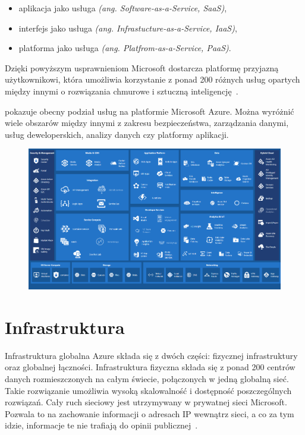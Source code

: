 \begin{itemize}
    \item aplikacja jako usługa \textit{(ang. Software-as-a-Service, SaaS)},
    \item interfejs jako usługa \textit{(ang. Infrastucture-as-a-Service, IaaS)},
    \item platforma jako usługa \textit{(ang. Platfrom-as-a-Service, PaaS)}.
\end{itemize}
Dzięki powyższym usprawnieniom Microsoft dostarcza platformę przyjazną użytkownikowi, która umożliwia korzystanie z ponad 200 różnych usług opartych między innymi o rozwiązania chmurowe i sztuczną inteligencję~\cite{Roosevelt2022, MicrosoftAzurec, Datashift}.

\vfill
\pagebreak

 pokazuje obecny podział usług na platformie Microsoft Azure. Można wyróżnić wiele obszarów między innymi z zakresu bezpieczeństwa, zarządzania danymi, usług deweloperskich, analizy danych czy platformy aplikacji.

\begin{figure}[H]
    \includegraphics[width=\textwidth]{images/ms_azure}
    \label{fig:ms-azure}
\end{figure}

\section{Infrastruktura}
Infrastruktura globalna Azure składa się z dwóch części: fizycznej infrastruktury oraz globalnej łączności. Infrastruktura fizyczna składa się z ponad 200 centrów danych rozmieszczonych na całym świecie, połączonych w jedną globalną sieć. Takie rozwiązanie umożliwia wysoką skalowalność i dostępność poszczególnych rozwiązań. Cały ruch sieciowy jest utrzymywany w prywatnej sieci Microsoft. Pozwala to na zachowanie informacji o adresach IP wewnątrz sieci, a co za tym idzie, informacje te nie trafiają do opinii publicznej~\cite{MicrosoftAzureb}.\\ \\

